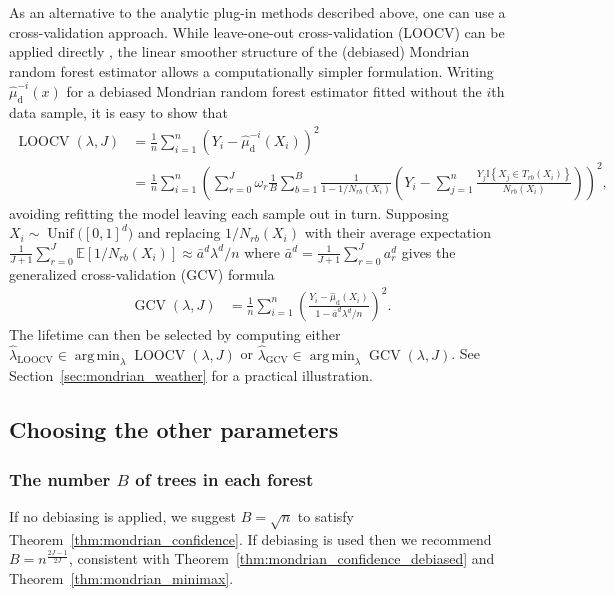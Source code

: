 \documentclass[11pt,lof]{puthesis}
\newcommand{\E}{\ensuremath{\mathbb{E}}}
\newcommand{\I}{\ensuremath{\mathbb{I}}}
\newcommand{\rd}{\ensuremath{\mathrm{d}}}
\DeclareMathOperator{\LOOCV}{LOOCV}
\DeclareMathOperator{\GCV}{GCV}
\DeclareMathOperator{\Unif}{Unif}
\DeclareMathOperator*{\argmin}{arg\,min}
\theoremstyle{break}
\theoremstyle{proof}
\begin{document}
As an alternative to the analytic plug-in methods described above, one can use
a cross-validation approach. While leave-one-out cross-validation (LOOCV) can
be applied directly \citep{fan2020statistical},
the linear smoother structure of the (debiased) Mondrian
random forest estimator allows a computationally simpler formulation. Writing
$\hat\mu_\rd^{-i}(x)$ for a debiased Mondrian random forest estimator fitted
without the $i$th data sample, it is easy to show that
%
\begin{align*}
  \LOOCV(\lambda, J)
  &=
  \frac{1}{n}
  \sum_{i=1}^{n}
  \left( Y_i - \hat\mu_\rd^{-i}(X_i) \right)^2 \\
  &=
  \frac{1}{n}
  \sum_{i=1}^{n}
  \left(
    \sum_{r=0}^{J}
    \omega_r
    \frac{1}{B}
    \sum_{b=1}^{B}
    \frac{1}{1 - 1/N_{r b}(X_i)}
    \left( Y_i -
      \sum_{j=1}^{n}
      \frac{ Y_j \I \left\{ X_j \in T_{r b}(X_i) \right\}}
      {N_{r b}(X_i)}
    \right)
  \right)^{2},
\end{align*}
%
avoiding refitting the model leaving each sample out in turn.
Supposing $X_i \sim \Unif\big([0,1]^d\big)$ and
replacing $1/N_{r b}(X_i)$ with their average expectation
$ \frac{1}{J+1} \sum_{r=0}^{J} \E \left[ 1/N_{r b}(X_i) \right]
\approx \bar a^d \lambda^d / n$
where $\bar a^d = \frac{1}{J+1} \sum_{r=0}^{J} a_r^d$
gives the generalized cross-validation (GCV) formula
%
\begin{align}
  \label{eq:mondrian_gcv}
  \GCV(\lambda, J)
  &=
  \frac{1}{n}
  \sum_{i=1}^{n}
  \left(
    \frac{Y_i - \hat\mu_\rd(X_i)}
    {1 - \bar a^d \lambda^d / n}
  \right)^2.
\end{align}
%
The lifetime can then be selected by computing
either $\hat\lambda_{\LOOCV} \in \argmin_\lambda \LOOCV(\lambda, J)$
or $\hat\lambda_{\GCV} \in \argmin_\lambda \GCV(\lambda, J)$.
See Section~\ref{sec:mondrian_weather} for a practical illustration.

\subsection{Choosing the other parameters}

\subsubsection*{The number \texorpdfstring{$B$}{B} of trees in each forest}%

If no debiasing is applied, we suggest
$B = \sqrt{n}$ to satisfy
Theorem~\ref{thm:mondrian_confidence}.
If debiasing is used then we recommend
$B = n^{\frac{2J-1}{2J}}$, consistent with
Theorem~\ref{thm:mondrian_confidence_debiased}
and Theorem~\ref{thm:mondrian_minimax}.
\end{document}
